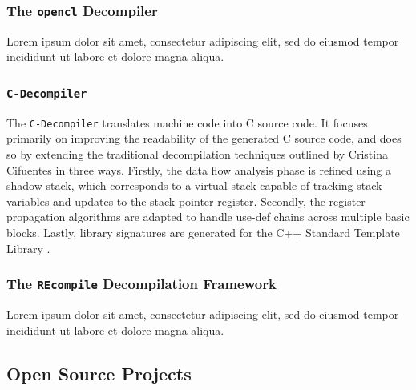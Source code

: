 \documentclass[12pt, a4paper]{article}
\begin{document}
\cite{rev_comp}


\subsubsection{The \texttt{opencl} Decompiler}

Lorem ipsum dolor sit amet, consectetur adipiscing elit, sed do eiusmod tempor incididunt ut labore et dolore magna aliqua.

\cite{decomp_llvm}


\subsubsection{\texttt{C-Decompiler}}

The \texttt{C-Decompiler} translates machine code into C source code. It focuses primarily on improving the readability of the generated C source code, and does so by extending the traditional decompilation techniques outlined by Cristina Cifuentes in three ways. Firstly, the data flow analysis phase is refined using a shadow stack, which corresponds to a virtual stack capable of tracking stack variables and updates to the stack pointer register. Secondly, the register propagation algorithms are adapted to handle use-def chains across multiple basic blocks. Lastly, library signatures are generated for the C++ Standard Template Library \cite{readable_decomp}.


\subsubsection{The \texttt{REcompile} Decompilation Framework}

Lorem ipsum dolor sit amet, consectetur adipiscing elit, sed do eiusmod tempor incididunt ut labore et dolore magna aliqua.

\cite{recompile}


\subsection{Open Source Projects}
\end{document}
